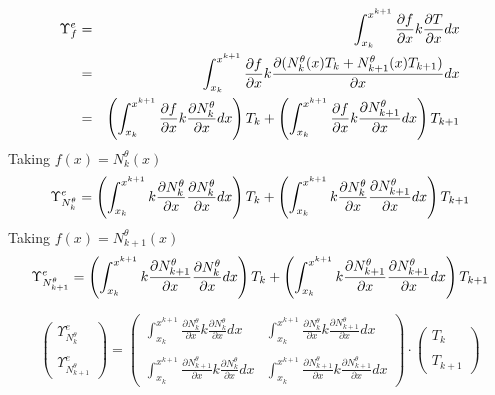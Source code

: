 \begin{eqnarray}
{\Upsilon}_f^e &=&
\int_{x_k}^{x^{k+1}} \frac{\partial f}{\partial x} k \frac{\partial T}{\partial x} dx \nonumber\\
&=&
\int_{x_k}^{x^{k+1}} \frac{\partial f}{\partial x} k \frac{\partial  (N_{k}^\theta(x) T_k + N_{k+1}^\theta(x) T_{k+1} ) }{\partial x} dx  \nonumber\\
&=&
\left( \int_{x_k}^{x^{k+1}} \frac{\partial f}{\partial x}  k \frac{\partial  N_{k}^\theta } {\partial x}  dx \right)  T_k 
+ \left( \int_{x_k}^{x^{k+1}} \frac{\partial f}{\partial x}  k \frac{\partial  N_{k+1}^\theta } {\partial x} dx \right) T_{k+1}  \nonumber
\end{eqnarray}
Taking $f(x)=N_k^\theta(x)$ 
\[
{\Upsilon}_{N_k^\theta}^e=
\left( \int_{x_k}^{x^{k+1}} k\frac{\partial N_k^\theta}{\partial x}  \frac{\partial  N_{k}^\theta } {\partial x}  dx \right)  T_k 
+ \left( \int_{x_k}^{x^{k+1}} k \frac{\partial N_k^\theta}{\partial x}  \frac{\partial  N_{k+1}^\theta } {\partial x} dx \right) T_{k+1}  \nonumber
\]
Taking $f(x)=N_{k+1}^\theta(x)$ 
\[
{\Upsilon}_{N_{k+1}^\theta}^e=
\left( \int_{x_k}^{x^{k+1}} k\frac{\partial N_{k+1}^\theta}{\partial x}  \frac{\partial  N_{k}^\theta } {\partial x}  dx \right)  T_k 
+ \left( \int_{x_k}^{x^{k+1}}  k\frac{\partial N_{k+1}^\theta}{\partial x}  \frac{\partial  N_{k+1}^\theta } {\partial x} dx \right) T_{k+1}  \nonumber
\]


\[
\left(
\begin{array}{cc}
 {\Upsilon}_{N_k^\theta}^e \\ \\ {\Upsilon}_{N_{k+1}^\theta}^e
\end{array}
\right)
=
\left(
\begin{array}{cc}
\int_{x_k}^{x^{k+1}} \frac{\partial N_k^\theta}{\partial x} k \frac{\partial  N_{k}^\theta } {\partial x}  dx & 
\int_{x_k}^{x^{k+1}} \frac{\partial N_k^\theta}{\partial x} k \frac{\partial  N_{k+1}^\theta } {\partial x} dx 
\\ \\
\int_{x_k}^{x^{k+1}} \frac{\partial N_{k+1}^\theta}{\partial x} k \frac{\partial  N_{k}^\theta } {\partial x}  dx & 
\int_{x_k}^{x^{k+1}} \frac{\partial N_{k+1}^\theta}{\partial x} k \frac{\partial  N_{k+1}^\theta } {\partial x} dx 
\end{array}
\right)
\cdot
\left(
\begin{array}{c}
T_k \\ \\ T_{k+1}
\end{array}
\right)
\]

